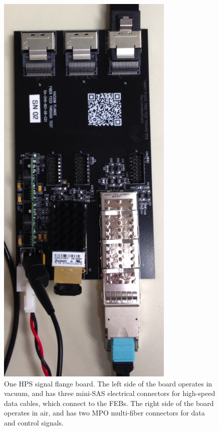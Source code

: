 \begin{figure}[ht]
    \includegraphics[angle=90,width=\textwidth]{detector/figs/flangeboard}
    \caption{One HPS signal flange board.
    The left side of the board operates in vacuum, and has three mini-SAS electrical connectors for high-speed data cables, which connect to the FEBs.
The right side of the board operates in air, and has two MPO multi-fiber connectors for data and control signals.}
    \label{fig:flangeboard}
\end{figure}

